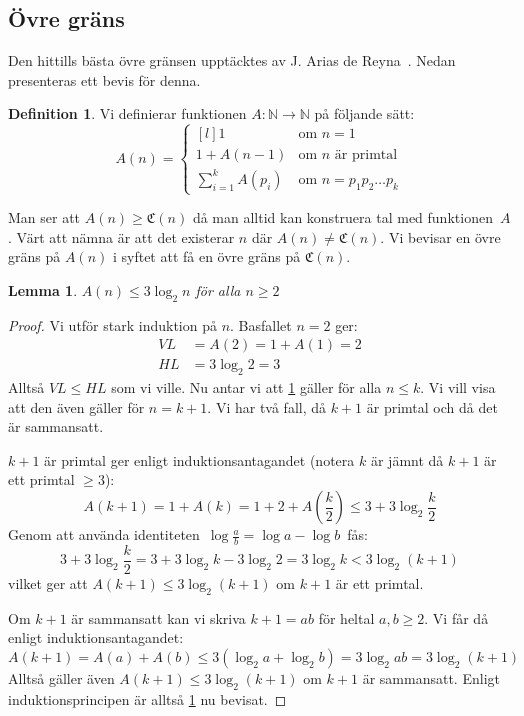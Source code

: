 \documentclass[a4paper,titlepage]{article}
\newcommand{\N}{\mathbb{N}}
\newcommand{\C}[1]{\mathfrak C \left( #1 \right)}
\newtheorem{lemma}{Lemma}
\theoremstyle{definition}
\newtheorem{definition}{Definition}
\begin{document}
    \subsection{Övre gräns}
    \label{ovregrans}
    Den hittills bästa övre gränsen upptäcktes av J. Arias de
    Reyna~\cite{spansk}.
    Nedan presenteras ett bevis för denna.
    \begin{definition}
        Vi definierar funktionen $A:\N\to\N$ på följande sätt:
        $$ A(n) = \left\{ \begin{matrix*}[l] 1 & \text{om } n=1 \\ 1+A(n-1) & \text{om $n$ är primtal} \\ \sum_{i=1}^kA(p_i) & \text{om } n=p_1p_2 \ldots p_k \end{matrix*} \right. $$
    \end{definition}

    Man ser att $A(n)\ge\C{n}$ då man alltid kan konstruera tal med
    funktionen~$A$. Värt att nämna är att det existerar $n$ där $A(n)\neq\C{n}$.
    Vi bevisar en övre gräns på $A(n)$ i syftet att få en övre gräns på $\C{n}$.

    \begin{lemma}
        $A(n)\le 3 \log_2{n}$ \quad för alla $n\ge2$
        \label{lemma:adrian}
    \end{lemma}
    \begin{proof}
        Vi utför stark induktion på $n$. Basfallet $n=2$ ger:
        \begin{align*}
            VL &=A(2)=1+A(1)=2\\
            HL &= 3 \log_2{2}=3 
        \end{align*}
        Alltså $VL \le HL$ som vi ville.
        Nu antar vi att \cref{lemma:adrian} gäller för alla $n \le k$. Vi vill
        visa att den även gäller för $n=k+1$.
        Vi har två fall, då $k+1$ är primtal och då det är sammansatt.

        $k+1$ är primtal ger enligt induktionsantagandet (notera $k$ är jämnt
        då $k+1$ är ett primtal $\ge3$):
        $$A(k+1) = 1 + A(k) = 1+2+A\left(\frac{k}{2}\right) \le 3 + 3 \log_2\frac{k}{2}$$
        Genom att använda identiteten \,$\log \frac{a}{b}=\log a -\log b$\, fås:
        $$ 3 + 3 \log_2\frac{k}{2} = 3 + 3\log_2 k - 3\log_2 2 = 3\log_2 k < 3\log_2 (k+1)$$
        vilket ger att $A(k+1)\le 3\log_2 (k+1)$ om $k+1$ är ett primtal.

        Om $k+1$ är sammansatt kan vi skriva $k+1 = ab$ för heltal $a,b \ge 2$.
        Vi får då enligt induktionsantagandet:
        $$A(k+1) = A(a)+A(b) \le 3(\log_2a + \log_2b) = 3\log_2 ab = 3\log_2
        (k+1)$$ Alltså gäller även $A(k+1) \le 3\log_2 (k+1)$ om $k+1$ är
        sammansatt. Enligt induktionsprincipen är alltså \cref{lemma:adrian} nu
        bevisat.
    \end{proof}
\end{document}
